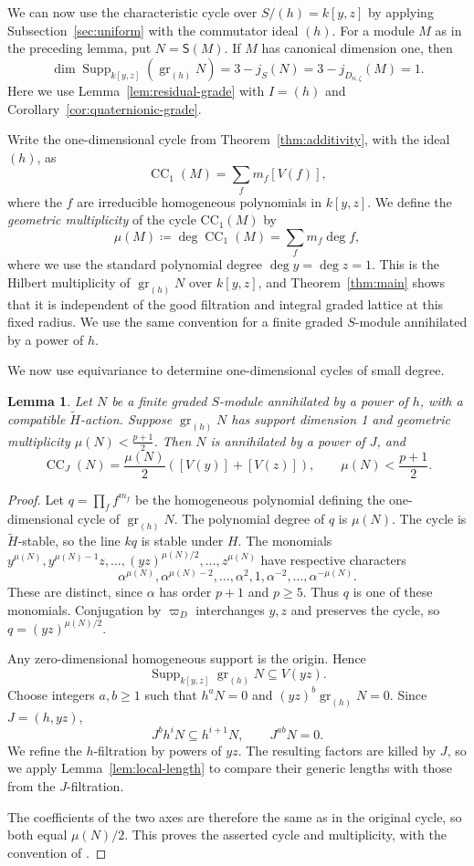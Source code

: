 \documentclass[11pt]{article}
\newtheorem{lemma}[theorem]{Lemma}
\theoremstyle{definition}
\newcommand{\gr}{\operatorname{gr}}
\newcommand{\CC}{\operatorname{CC}}
\newcommand{\Supp}{\operatorname{Supp}}
\begin{document}
We can now use the characteristic cycle over
$S/(h)=k[y,z]$ by applying Subsection~\ref{sec:uniform} with the
commutator ideal $(h)$. For a module $M$ as in the preceding
lemma, put $N=\mathsf S(M)$. If $M$ has canonical dimension one,
then
\[
 \dim\Supp_{k[y,z]}(\gr_{(h)}N)
 =3-j_S(N)=3-j_{D_{n,\zeta}}(M)=1.
\]
Here we use Lemma~\ref{lem:residual-grade} with $I=(h)$ and
Corollary~\ref{cor:quaternionic-grade}.

Write the one-dimensional cycle from Theorem~\ref{thm:additivity},
with the ideal $(h)$, as
\[
 \CC_1(M)=\sum_f m_f[V(f)],
\]
where the $f$ are irreducible homogeneous polynomials in $k[y,z]$.
We define the \emph{geometric multiplicity} of the cycle $\mathrm{CC}_1(M)$ by
\[
 \mu(M)\coloneqq\deg\CC_1(M)=\sum_f m_f\deg f,
\]
where we use the standard polynomial degree $\deg y=\deg z=1$.
This is the Hilbert multiplicity of
$\gr_{(h)}N$ over $k[y,z]$, and Theorem~\ref{thm:main} shows that it is independent
of the good filtration and integral graded lattice at this
fixed radius. We use the same convention for a finite graded
$S$-module annihilated by a power of $h$.

We now use equivariance to determine one-dimensional cycles of small degree.

\begin{lemma}\label{lem:geometric-two-J-support}
Let $N$ be a finite graded $S$-module annihilated by a power of
$h$, with a compatible $\widetilde H$-action. Suppose
$\gr_{(h)}N$ has support dimension 1 and geometric multiplicity $\mu(N)<\frac{p+1}{2}$.
Then $N$ is annihilated by a power of $J$, and
\[
 \CC_J(N)=\frac{\mu(N)}{2}([V(y)]+[V(z)]),\qquad \mu(N)<\frac{p+1}{2}.
\]
\end{lemma}
\begin{proof}
Let $q=\prod_f f^{m_f}$ be the homogeneous polynomial defining
the one-dimensional cycle of $\gr_{(h)}N$. The polynomial degree of $q$ is $\mu(N)$.
The cycle is $\widetilde H$-stable, so the line $kq$ is stable
under $H$. The monomials $y^{\mu(N)}, y^{\mu(N)-1}z,\dots,(yz)^{\mu(N)/2},\dots,z^{\mu(N)}$ have respective characters
\[
 \alpha^{\mu(N)}, \alpha^{\mu(N)-2}, \dots, \alpha^2,1,\alpha^{-2}, \dots, \alpha^{-\mu(N)}.
\]
These are distinct, since $\alpha$ has order $p+1$ and $p\geq5$.
Thus $q$ is one of these monomials. Conjugation by
$\varpi_D$ interchanges $y,z$ and preserves the cycle, so
$q=(yz)^{\mu(N)/2}$.

Any zero-dimensional homogeneous support is the origin. Hence
\[
 \Supp_{k[y,z]}\gr_{(h)}N\subseteq V(yz).
\]
Choose integers $a,b\geq1$ such that
$h^aN=0$ and $(yz)^b\gr_{(h)}N=0$. Since $J=(h,yz)$,
\[
 J^b h^iN\subseteq h^{i+1}N,
 \qquad J^{ab}N=0.
\]
We refine the $h$-filtration by powers of $yz$. The resulting
factors are killed by $J$, so we apply Lemma~\ref{lem:local-length}
to compare their generic lengths with those from the $J$-filtration.

The coefficients of the two axes are therefore the same as in the
original cycle, so both equal $\mu(N)/2$. This proves the asserted cycle and
multiplicity, with the convention of
\cite[\S3.2]{HuWangPadic}.
\end{proof}
\end{document}
